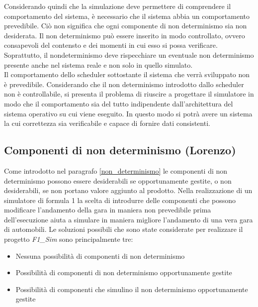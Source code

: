 Considerando quindi che la simulazione deve permettere di comprendere il comportamento del sistema, è necessario che il sistema abbia 
un comportamento prevedibile. Ciò non significa che ogni componente di non determinismo sia non desiderata. Il non determinismo
può essere inserito in modo controllato, ovvero consapevoli del contensto e dei momenti in cui esso si possa verificare. Soprattutto,
il nondeterminismo deve rispecchiare un eventuale non determinismo presente anche nel sistema reale e non solo in quello simulato.\\
Il comportamento dello scheduler sottostante il sistema che verrà sviluppato non è prevedibile. Considerando che il non determinismo
introdotto dallo scheduler non è controllabile, si presenta
il problema di riuscire a progettare il simulatore in modo
che il comportamento sia del tutto indipendente dall'architettura del sistema operativo su cui viene eseguito. In questo
modo si potrà avere un sistema la cui correttezza sia verificabile e capace di fornire dati consistenti.
\subsection{Componenti di non determinismo (Lorenzo)}
Come introdotto nel paragrafo \ref{non_determinismo} le componenti di non determinismo possono essere desiderabili se opportunamente gestite, o non desiderabili, se non portano valore aggiunto al prodotto. Nella realizzazione di un simulatore di formula 1 la scelta di introdurre delle componenti che possono modificare l'andamento della gara in maniera non prevedibile prima dell'esecuzione aiuta a simulare in maniera migliore l'andamento di una vera gara di automobili. Le soluzioni possibili che sono state considerate per realizzare il progetto \emph{F1\_Sim} sono principalmente tre:
\begin{itemize}
\item Nessuna possibilit\`{a} di componenti di non determinismo
\item Possibilit\`{a} di componenti di non determinismo opportunamente gestite
\item Possibilit\`{a} di componenti che simulino il non determinismo opportunamente gestite
\end{itemize}
